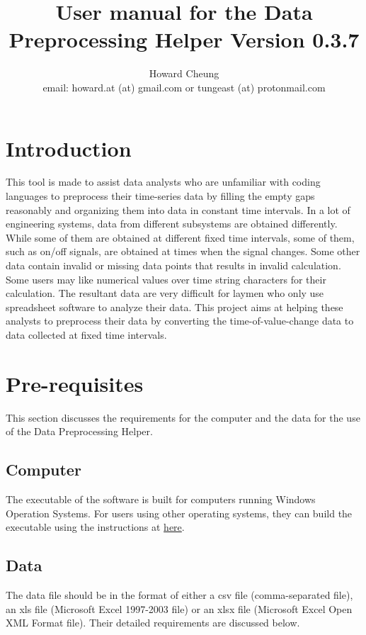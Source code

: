 \documentclass[12pt,a4paper]{article}
\author{Howard Cheung \\ email: howard.at (at) gmail.com or tungeast (at) protonmail.com}
\title{User manual for the Data Preprocessing Helper Version 0.3.7}
\begin{document}
\maketitle

\tableofcontents

\section{Introduction}

This tool is made to assist data analysts who are unfamiliar with coding languages to preprocess their time-series data by filling the empty gaps reasonably and organizing them into data in constant time intervals.
In a lot of engineering systems, data from different subsystems are obtained differently.
While some of them are obtained at different fixed time intervals, some of them, such as on/off signals, are obtained at times when the signal changes.
Some other data contain invalid or missing data points that results in invalid calculation.
Some users may like numerical values over time string characters for their calculation.
The resultant data are very difficult for laymen who only use spreadsheet software to analyze their data.
This project aims at helping these analysts to preprocess their data by converting the time-of-value-change data to data collected at fixed time intervals.

\section{Pre-requisites}
This section discusses the requirements for the computer and the data for the use of the Data Preprocessing Helper.

\subsection{Computer}
The executable of the software is built for computers running Windows Operation Systems.
For users using other operating systems, they can build the executable using the instructions at \href{https://github.com/howardcheung/data-preprocessing-helper/blob/master/exe/README.md}{here}.

\subsection{Data}
The data file should be in the format of either a csv file (comma-separated file), an xls file (Microsoft Excel 1997-2003 file) or an xlsx file (Microsoft Excel Open XML Format file). Their detailed requirements are discussed below.
\end{document}
